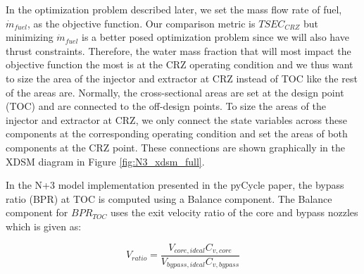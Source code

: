 \documentclass[conf]{new-aiaa}
\begin{document}
In the optimization problem described later, we set the mass flow rate of fuel, $\dot{m}_{fuel}$, as the objective function.
Our comparison metric is $TSEC_{CRZ}$ but minimizing $\dot{m}_{fuel}$ is a better posed optimization problem since we will also have thrust constraints.
Therefore, the water mass fraction that will most impact the objective function the most is at the CRZ operating condition and we thus want to size the area of the injector and extractor at CRZ instead of TOC like the rest of the areas are.
Normally, the cross-sectional areas are set at the design point (TOC) and are connected to the off-design points.
To size the areas of the injector and extractor at CRZ, we only connect the state variables across these components at the corresponding operating condition and set the areas of both components at the CRZ point.
These connections are shown graphically in the XDSM diagram in Figure \ref{fig:N3_xdsm_full}.

In the N+3 model implementation presented in the pyCycle paper, the bypass ratio (BPR) at TOC is computed using a Balance component.
The Balance component for $BPR_{TOC}$ uses the exit velocity ratio of the core and bypass nozzles which is given as:

\begin{equation}
    V_{ratio} = \frac{V_{core,ideal}C_{v,core}}{V_{bypass,ideal}C_{v,bypass}}
\end{equation}
\end{document}
